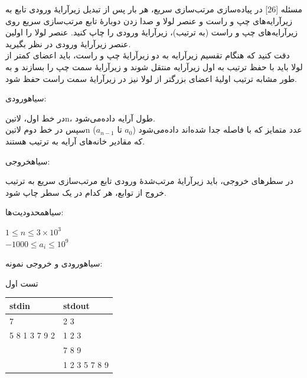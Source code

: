 ‌مسئله [26]
در پیاده‌سازی مرتب‌سازی سریع، هر بار پس از تبدیل زیرآرایهٔ ورودی تابع به زیرآرایه‌های چپ و راست و عنصر لولا و صدا زدن دوبارهٔ تابع مرتب‌سازی سریع روی زیرآرایه‌های چپ و راست (به ترتیب)، زیرآرایهٔ ورودی را چاپ کنید. عنصر لولا را اولین عنصر زیرآرایهٔ ورودی در نظر بگیرید.\\
دقت کنید که هنگام تقسیم زیرآرایه به دو زیرآرایهٔ چپ و راست، باید اعضای کمتر از لولا باید با حفظ ترتیب به اول زیرآرایه منتقل شوند و زیرآرایهٔ سمت چپ را بسازند و به طور مشابه ترتیب اولیهٔ اعضای بزرگتر از لولا نیز در زیرآرایهٔ سمت راست حفظ شود.

‌سیاه{ورودی:}
\par
در خط اول، ‌لاتین{n}، طول آرایه داده‌می‌شود.\\
سپس در خط دوم ‌لاتین{n} عدد متمایز که با فاصله جدا شده‌اند داده‌می‌شود ($a_0$ تا $a_{n-1}$) که مقادیر خانه‌های آرایه به ترتیب هستند.
\par
{}‌سیاه{خروجی:}
\par
در سطرهای خروجی، باید زیرآرایهٔ مرتب‌شدهٔ ورودی تابع مرتب‌سازی سریع به ترتیب خروج از توابع، هر کدام در یک سطر چاپ شود.
\par
{}‌سیاه{محدودیت‌ها:}
\par
$1 \leq n \leq 3\times10^3$\\
$-1000 \leq a_i \leq 10^9$\par

‌سیاه{ورودی و خروجی نمونه:}
\par
تست اول
\begin{latin}
	\begin{tabularx}{\textwidth}{|X | X|}
		\hline
		\textbf{stdin} &
		\textbf{stdout}\\
		\hline
		7 & 2 3\\
		5 8 1 3 7 9 2 & 1 2 3\\
		& 7 8 9\\
		& 1 2 3 5 7 8 9\\
		\hline
	\end{tabularx}
\end{latin}

